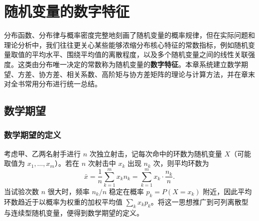 %
%

\chapter{随机变量的数字特征}
\label{ch:numerical-characteristics}

分布函数、分布律与概率密度完整地刻画了随机变量的概率规律，但在实际问题和理论分析中，我们往往更关心某些能够浓缩分布核心特征的常数指标，例如随机变量取值的平均水平、围绕平均值的离散程度，以及多个随机变量之间的线性关联强度。这类由分布唯一决定的常数称为随机变量的\textbf{数字特征}。本章系统建立数学期望、方差、协方差、相关系数、高阶矩与协方差矩阵的理论与计算方法，并在章末对全书常用分布进行统一总结。

\section{数学期望}
\label{sec:expectation}

\subsection{数学期望的定义}

考虑甲、乙两名射手进行 $n$ 次独立射击，记每次命中的环数为随机变量 $X$（可能取值为 $x_1,\ldots,x_m$）。若在 $n$ 次射击中 $x_k$ 出现 $n_k$ 次，则平均环数为
\[
  \bar{x}=\frac{1}{n}\sum_{k=1}^{m}x_k n_k=\sum_{k=1}^{m}x_k\cdot\frac{n_k}{n}.
\]
当试验次数 $n$ 很大时，频率 $n_k/n$ 稳定在概率 $p_k=P(X=x_k)$ 附近，因此平均环数趋近于以概率为权重的加权平均值 $\sum_{k}x_k p_k$。将这一思想推广到可列离散型与连续型随机变量，便得到数学期望的定义。

